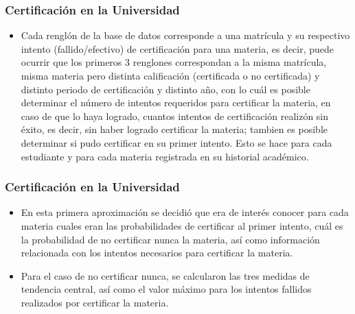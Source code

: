 \documentclass[xcolor=dvipsnames]{beamer}
\begin{document}
\begin{frame}\frametitle{Certificaci\'on en la Universidad}
\begin{itemize}

\item Cada rengl\'on de la base de datos corresponde a una matr\'icula y su respectivo intento (fallido/efectivo) de certificaci\'on para una materia, es decir, puede ocurrir que los primeros 3 renglones correspondan a la misma matr\'icula, misma materia pero distinta calificaci\'on (certificada o no certificada) y distinto periodo de certificaci\'on y distinto a\~no, con lo cu\'al es posible determinar el n\'umero de intentos requeridos para certificar la materia, en caso de que lo haya logrado, cuantos intentos de certificaci\'on realiz\'on sin \'exito, es decir, sin haber logrado certificar la materia; tambien es posible determinar si pudo certificar en su primer intento. Esto se hace para cada estudiante y para cada materia registrada en su historial acad\'emico. 


\end{itemize}


\end{frame}


\begin{frame}\frametitle{Certificaci\'on en la Universidad}
\begin{itemize}

\item En esta primera aproximaci\'on se decidi\'o que era de inter\'es conocer para cada materia cuales eran las probabilidades de certificar al primer intento, cu\'al es la probabilidad de no certificar nunca la materia, as\'i como informaci\'on  relacionada con los intentos necesarios para certificar la materia.



\item Para el caso de no certificar nunca, se calcularon las tres medidas de tendencia central, as\'i como el valor m\'aximo para los intentos fallidos realizados por certificar la materia.

\end{itemize}

\end{frame}
\end{document}

